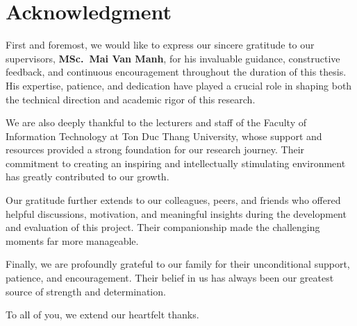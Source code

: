 \chapter*{Acknowledgment}


First and foremost, we would like to express our sincere gratitude to our supervisors, \textbf{MSc.~Mai Van Manh}, for his 
invaluable guidance, constructive feedback, and continuous encouragement throughout the duration of this thesis. 
His expertise, patience, and dedication have played a crucial role in shaping both the 
technical direction and academic rigor of this research.

We are also deeply thankful to the lecturers and staff of the Faculty of Information Technology at Ton Duc Thang University, 
whose support and resources provided a strong foundation 
for our research journey. Their commitment to creating an inspiring and intellectually 
stimulating environment has greatly contributed to our growth.

Our gratitude further extends to our colleagues, peers, and friends who offered helpful 
discussions, motivation, and meaningful insights during the development and evaluation of 
this project. Their companionship made the challenging moments far more manageable.

Finally, we are profoundly grateful to our family for their unconditional support, patience, 
and encouragement. Their belief in us has always been our greatest source of strength and 
determination.

To all of you, we extend our heartfelt thanks.